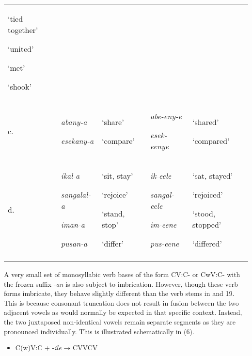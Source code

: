 \documentclass[output=paper]{langsci/langscibook}
\begin{document}
\begin{tabular}{lllll}
{\mdseries ‘tied together’}

{\mdseries ‘united’}

{\mdseries ‘met’}

\mdseries ‘shook’\\
\mdseries c. & {\mdseries \emph{abany-a}}

\mdseries \emph{esekany-a} & {\mdseries ‘share’}

\mdseries ‘compare’ & {\mdseries \emph{abe-eny-e}}

\mdseries \emph{esek-eenye} & {\mdseries ‘shared’}

\mdseries ‘compared’\\
\mdseries d. & {\mdseries \emph{ikal-a}}

{\mdseries \emph{sangalal-a}}

{\mdseries \emph{iman-a}}

\mdseries \emph{pusan-a} & {\mdseries ‘sit, stay’}

{\mdseries ‘rejoice’}

{\mdseries ‘stand, stop’}

\mdseries ‘differ’ & {\mdseries \emph{ik-eele}}

{\mdseries \emph{sangal-eele}}

{\mdseries \emph{im-eene}}

\mdseries \emph{pus-eene} & {\mdseries ‘sat, stayed’}

{\mdseries ‘rejoiced’}

{\mdseries ‘stood, stopped’}

{\mdseries ‘differed’}\\
\lspbottomrule
\end{tabular}
A very small set of monosyllabic verb bases of the form CV:C- or CwV:C- with the frozen suffix -\emph{an} is also subject to imbrication. However, though these verb forms imbricate, they behave slightly different than the verb stems in  and 19. This is because consonant truncation does not result in fusion between the two adjacent vowels as would normally be expected in that specific context. Instead, the two juxtaposed non-identical vowels remain separate segments as they are pronounced individually. This is illustrated schematically in (6). 

\begin{itemize}
\item \begin{stylelsLanginfo}
C(w)V:C + -\emph{ile}  → CVVCV
\end{stylelsLanginfo}\end{itemize}
\end{document}
